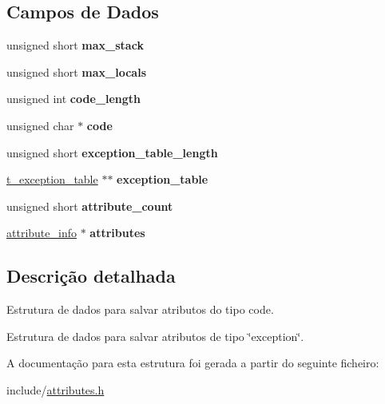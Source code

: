 \subsection*{Campos de Dados}
\begin{DoxyCompactItemize}
\item 
\mbox{\label{structcode__attribute_ad8f0d9ec65c9065df510fb7313133eb0}} 
unsigned short {\bfseries max\+\_\+stack}
\item 
\mbox{\label{structcode__attribute_aa5c39f7692d14498f497ac2425595dda}} 
unsigned short {\bfseries max\+\_\+locals}
\item 
\mbox{\label{structcode__attribute_a8d9bb88d00f7285dbad08ec687adfd2c}} 
unsigned int {\bfseries code\+\_\+length}
\item 
\mbox{\label{structcode__attribute_ad469a918dcfae54358813c9ccfa2b603}} 
unsigned char $\ast$ {\bfseries code}
\item 
\mbox{\label{structcode__attribute_a52263ac885da86196b36a51e7ee5bd6e}} 
unsigned short {\bfseries exception\+\_\+table\+\_\+length}
\item 
\mbox{\label{structcode__attribute_a7d1657d4edf179c1596f9c102a887b3e}} 
\hyperlink{structt__exception__table}{t\+\_\+exception\+\_\+table} $\ast$$\ast$ {\bfseries exception\+\_\+table}
\item 
\mbox{\label{structcode__attribute_af71546c75dc3185e14b8cd5eb8cd6a24}} 
unsigned short {\bfseries attribute\+\_\+count}
\item 
\mbox{\label{structcode__attribute_a9f45491da8c177e471b75c9539bb37b2}} 
\hyperlink{structattribute__info}{attribute\+\_\+info} $\ast$ {\bfseries attributes}
\end{DoxyCompactItemize}


\subsection{Descrição detalhada}
Estrutura de dados para salvar atributos do tipo code. 

Estrutura de dados para salvar atributos de tipo \char`\"{}exception\char`\"{}. 

A documentação para esta estrutura foi gerada a partir do seguinte ficheiro\+:\begin{DoxyCompactItemize}
\item 
include/\hyperlink{attributes_8h}{attributes.\+h}\end{DoxyCompactItemize}
